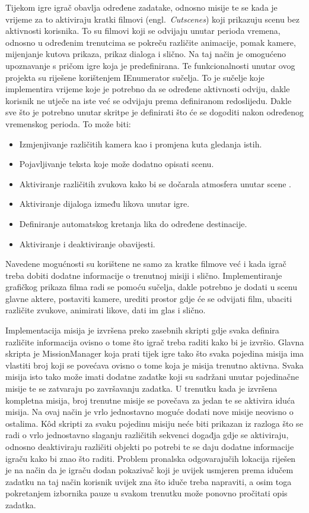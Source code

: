 Tijekom igre igrač obavlja određene zadatake, odnosno misije te se kada je vrijeme za to aktiviraju kratki filmovi (engl.~\textit{Cutscenes}) koji prikazuju scenu bez aktivnosti korisnika. To su filmovi koji se odvijaju unutar perioda vremena, odnosno u određenim trenutcima se pokreču različite animacije, pomak kamere, mijenjanje kutova prikaza, prikaz dialoga i slično. Na taj način je omogućeno upoznavanje s pričom igre koja je predefinirana. Te funkcionalnosti unutar ovog projekta su riješene korištenjem IEnumerator sučelja. To je sučelje koje implementira vrijeme koje je potrebno da se određene aktivnosti odviju, dakle korisnik ne utječe na iste već se odvijaju prema definiranom redoslijedu. Dakle sve što je potrebno unutar skritpe je definirati što će se dogoditi nakon određenog vremenskog perioda. To može biti:
 \begin{itemize}
  \item Izmjenjivanje različitih kamera kao i promjena kuta gledanja istih.
  \item Pojavljivanje teksta koje može dodatno opisati scenu.
  \item Aktiviranje različitih zvukova kako bi se dočarala atmosfera unutar scene .
  \item Aktiviranje dijaloga između likova unutar igre.
  \item Definiranje automatskog kretanja lika do određene destinacije.
  \item Aktiviranje i deaktiviranje obavijesti.
 \end{itemize}
Navedene mogućnosti su korištene ne samo za kratke filmove već i kada igrač treba dobiti dodatne informacije o trenutnoj misiji i slično. 
Implementiranje grafičkog prikaza filma radi se pomoću sučelja, dakle potrebno je dodati u scenu glavne aktere, postaviti kamere, urediti prostor gdje će se odvijati film, ubaciti različite zvukove, animirati likove, dati im glas i slično.

Implementacija misija je izvršena preko zasebnih skripti gdje svaka definira različite informacija ovisno o tome što igrač treba raditi kako bi je izvršio. Glavna skripta je MissionManager koja prati tijek igre tako što svaka pojedina misija ima vlastiti broj koji se povećava ovisno o tome koja je misija trenutno aktivna. Svaka misija isto tako može imati dodatne zadatke koji su sadržani unutar pojedinačne misije te se zatvaraju po završavanju zadatka. U trenutku kada je izvršena kompletna misija, broj trenutne misije se povečava za jedan te se aktivira iduća misija. Na ovaj način je vrlo jednostavno moguće dodati nove misije neovisno o ostalima. K\^od skripti za svaku pojedinu misiju neće biti prikazan iz razloga što se radi o vrlo jednostavno slaganju različitih sekvenci događja gdje se aktiviraju, odnosno deaktiviraju različiti objekti po potrebi te se daju dodatne informacije igraču kako bi znao što raditi. Problem pronalska odgovarajučih lokacija riješen je na način da je igraču dodan pokazivač koji je uvijek usmjeren prema idučem zadatku na taj način korisnik uvijek zna što iduče treba napraviti, a osim toga pokretanjem izbornika pauze u svakom trenutku može ponovno pročitati opis zadatka.

